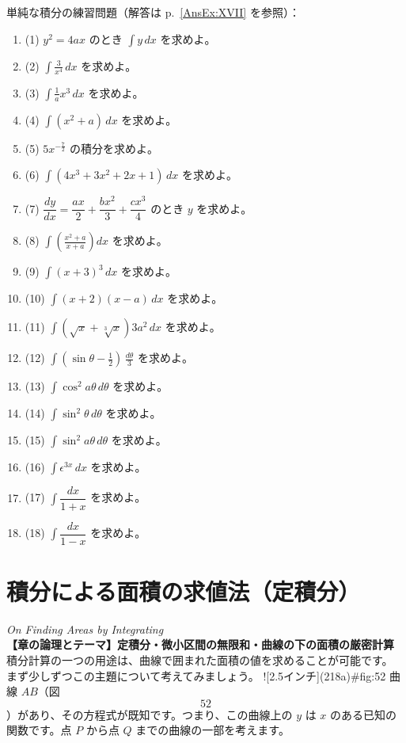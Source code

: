 \documentclass[a4paper,11pt,openany]{ltjsbook}
\newcommand{\Pageref}[2][p.]{#1~\ref{#2}}
\begin{document}
単純な積分の練習問題（解答は \Pageref{AnsEx:XVII} を参照）：

\begin{enumerate}
\item (1) $y^2 = 4ax$ のとき $\displaystyle \int y\, dx$ を求めよ。
\item (2) $\displaystyle \int \frac{3}{x^4}\, dx$ を求めよ。
\item (3) $\displaystyle \int \frac{1}{a} x^3\, dx$ を求めよ。
\item (4) $\displaystyle \int (x^2 + a)\, dx$ を求めよ。
\item (5) $5x^{-\frac{7}{2}}$ の積分を求めよ。
\item (6) $\displaystyle \int (4x^3 + 3x^2 + 2x + 1)\, dx$ を求めよ。
\item (7) $\dfrac{dy}{dx} = \dfrac{ax}{2} + \dfrac{bx^2}{3} + \dfrac{cx^3}{4}$ のとき $y$ を求めよ。
\item (8) $\displaystyle \int \left(\frac{x^2 + a}{x + a}\right) dx$ を求めよ。
\item (9) $\displaystyle \int (x + 3)^3\, dx$ を求めよ。
\item (10) $\displaystyle \int (x + 2)(x - a)\, dx$ を求めよ。
\item (11) $\displaystyle \int (\sqrt x + \sqrt[3] x) 3a^2\, dx$ を求めよ。
\item (12) $\displaystyle \int (\sin \theta - \tfrac{1}{2})\, \frac{d\theta}{3}$ を求めよ。
\item (13) $\displaystyle \int \cos^2 a \theta\, d\theta$ を求めよ。
\item (14) $\displaystyle \int \sin^2 \theta\, d\theta$ を求めよ。
\item (15) $\displaystyle \int \sin^2 a \theta\, d\theta$ を求めよ。
\item (16) $\displaystyle \int \epsilon^{3x}\, dx$ を求めよ。
\item (17) $\displaystyle \int \dfrac{dx}{1 + x}$ を求めよ。
\item (18) $\displaystyle \int \dfrac{dx}{1 - x}$ を求めよ。

\end{enumerate}



\chapter{積分による面積の求値法（定積分）}
\noindent\textit{\large On Finding Areas by Integrating}\\[2mm]
\noindent\textbf{\small 【章の論理とテーマ】定積分・微小区間の無限和・曲線の下の面積の厳密計算}\\[4mm]
積分計算の一つの用途は、曲線で囲まれた面積の値を求めることが可能です。
まず少しずつこの主題について考えてみましょう。
![2.5インチ](218a){\#fig:52}
曲線 $AB$（図\[52
\]）があり、その方程式が既知です。つまり、この曲線上の $y$ は $x$ のある已知の関数です。点 $P$ から点 $Q$ までの曲線の一部を考えます。
\end{document}
